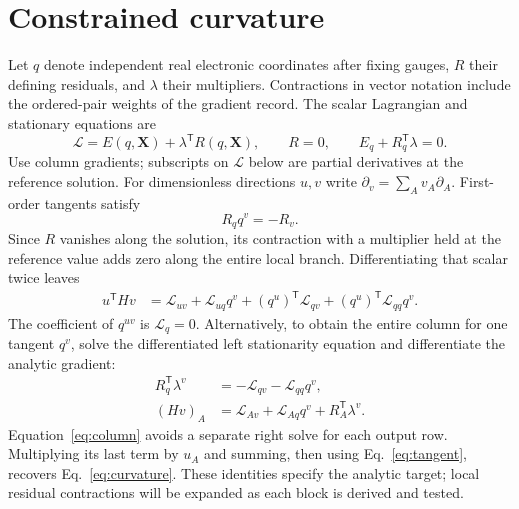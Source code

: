 \documentclass[11pt]{article}
\begin{document}
\section{Constrained curvature}
Let $q$ denote independent real electronic coordinates after fixing gauges,
$R$ their defining residuals, and $\lambda$ their multipliers. Contractions
in vector notation include the ordered-pair weights of the gradient record.
The scalar Lagrangian and stationary equations are
\begin{equation}
 \mathcal L=E(q,\mathbf X)+\lambda^{\mathsf T}R(q,\mathbf X),\qquad
 R=0,\qquad E_q+R_q^{\mathsf T}\lambda=0 .
\end{equation}
Use column gradients; subscripts on $\mathcal L$ below are partial derivatives
at the reference solution. For dimensionless directions $u,v$ write
$\partial_v=\sum_A v_A\partial_A$. First-order tangents satisfy
\begin{equation}
 R_q q^v=-R_v .
 \label{eq:tangent}
\end{equation}
Since $R$ vanishes along the solution, its contraction with a multiplier held
at the reference value adds zero along the entire local branch. Differentiating
that scalar twice leaves
\begin{align}
 u^{\mathsf T}Hv
 &=\mathcal L_{uv}+\mathcal L_{uq}q^v+(q^u)^{\mathsf T}\mathcal L_{qv}
   +(q^u)^{\mathsf T}\mathcal L_{qq}q^v . \label{eq:curvature}
\end{align}
The coefficient of $q^{uv}$ is $\mathcal L_q=0$.
Alternatively, to obtain the entire column for one tangent $q^v$, solve the
differentiated left stationarity equation and differentiate the analytic gradient:
\begin{align}
 R_q^{\mathsf T}\lambda^v&=-\mathcal L_{qv}-\mathcal L_{qq}q^v,\\
 (Hv)_A&=\mathcal L_{Av}+\mathcal L_{Aq}q^v+R_A^{\mathsf T}\lambda^v .
 \label{eq:column}
\end{align}
Equation~\eqref{eq:column} avoids a separate right solve for each output row.
Multiplying its last term by $u_A$ and summing, then using
Eq.~\eqref{eq:tangent}, recovers Eq.~\eqref{eq:curvature}.
These identities specify the analytic target; local residual contractions
will be expanded as each block is derived and tested.
\end{document}
